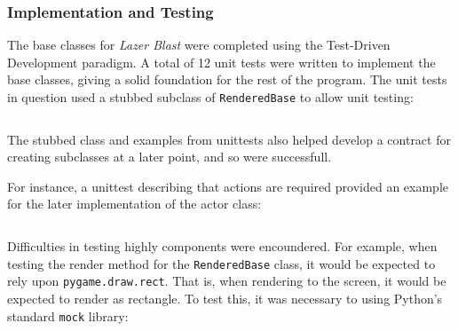 \subsubsection*{Implementation and Testing}
%
%

The base classes for \textit{Lazer Blast} were completed using
the Test-Driven Development paradigm.  A total of 12 unit tests
were written to implement the base classes, giving a solid foundation
for the rest of the program.  The unit tests in question used
a stubbed subclass of \texttt{RenderedBase} to allow unit
testing:

\inputminted[baselinestretch=1]{python}{../code/testing_mock_subclass.py}

The stubbed class and examples from unittests also helped develop
a contract for creating subclasses at a later point, and so were
successfull.

For instance, a unittest describing that actions are required provided
an example for the later implementation of the actor class:

\inputminted[baselinestretch=1]{python}{../code/testing_actions_required.py}

Difficulties in testing highly components were encoundered.  For
example, when testing the render method for the
\texttt{RenderedBase} class, it would be expected to rely
upon \texttt{pygame.draw.rect}.  That is, when rendering to
the screen, it would be expected to render as rectangle.  To test this,
it was necessary to using Python's standard \texttt{mock}
library:

\inputminted[baselinestretch=1]{python}{../code/testing_mocking.py}



